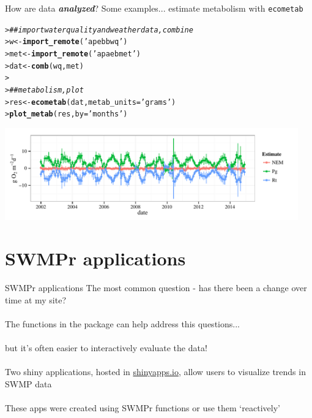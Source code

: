 \documentclass[serif]{beamer}\usepackage[]{graphicx}\usepackage[]{color}
\makeatletter
\newcommand{\hlstr}[1]{\textcolor[rgb]{0.192,0.494,0.8}{#1}}%
\newcommand{\hlcom}[1]{\textcolor[rgb]{0.678,0.584,0.686}{\textit{#1}}}%
\newcommand{\hlstd}[1]{\textcolor[rgb]{0.345,0.345,0.345}{#1}}%
\newcommand{\hlkwb}[1]{\textcolor[rgb]{0.69,0.353,0.396}{#1}}%
\newcommand{\hlkwc}[1]{\textcolor[rgb]{0.333,0.667,0.333}{#1}}%
\newcommand{\hlkwd}[1]{\textcolor[rgb]{0.737,0.353,0.396}{\textbf{#1}}}%
\newenvironment{kframe}{%
 \def\at@end@of@kframe{}%
 \ifinner\ifhmode%
  \def\at@end@of@kframe{\end{minipage}}%
  \begin{minipage}{\columnwidth}%
 \fi\fi%
 \def\FrameCommand##1{\hskip\@totalleftmargin \hskip-\fboxsep
 \colorbox{shadecolor}{##1}\hskip-\fboxsep
     \hskip-\linewidth \hskip-\@totalleftmargin \hskip\columnwidth}%
 \MakeFramed {\advance\hsize-\width
   \@totalleftmargin\z@ \linewidth\hsize
   \@setminipage}}%
 {\par\unskip\endMakeFramed%
 \at@end@of@kframe}
\newenvironment{knitrout}{}{} %
\newcommand{\Bigtxt}[1]{\textbf{\textit{#1}}}
\makeatother
\begin{document}
\begin{frame}[fragile,t]{How are data \Bigtxt{analyzed}?}
Some examples... estimate metabolism with \texttt{ecometab}
\begin{knitrout}\scriptsize
{}\color{fgcolor}\begin{kframe}
\begin{alltt}
\hlstd{> }\hlcom{## import water quality and weather data, combine}
\hlstd{> }\hlstd{w} \hlkwb{<-} \hlkwd{import_remote}\hlstd{(}\hlstr{'apebbwq'}\hlstd{)}
\hlstd{> }\hlstd{met} \hlkwb{<-} \hlkwd{import_remote}\hlstd{(}\hlstr{'apaebmet'}\hlstd{)}
\hlstd{> }\hlstd{dat} \hlkwb{<-} \hlkwd{comb}\hlstd{(wq, met)}
\hlstd{> }
\hlstd{> }\hlcom{## metabolism, plot}
\hlstd{> }\hlstd{res} \hlkwb{<-} \hlkwd{ecometab}\hlstd{(dat,} \hlkwc{metab_units} \hlstd{=} \hlstr{'grams'}\hlstd{)}
\hlstd{> }\hlkwd{plot_metab}\hlstd{(res,} \hlkwc{by} \hlstd{=} \hlstr{'months'}\hlstd{)}
\end{alltt}
\end{kframe}
\end{knitrout}
\begin{knitrout}
\color{fgcolor}

{\centering \includegraphics[width=0.95\textwidth]{fig//ecometab} 

}



\end{knitrout}
\end{frame}

\section{SWMPr applications}

\begin{frame}{SWMPr applications}
The most common question - has there been a change over time at my site? \\~\\
The functions in the package can help address this questions...\\~\\
but it's often easier to interactively evaluate the data! \\~\\
Two shiny applications, hosted in \href{http://www.shinyapps.io/}{shinyapps.io}, allow users to visualize trends in SWMP data \\~\\
These apps were created using SWMPr functions or use them `reactively'
\end{frame}
\end{document}
